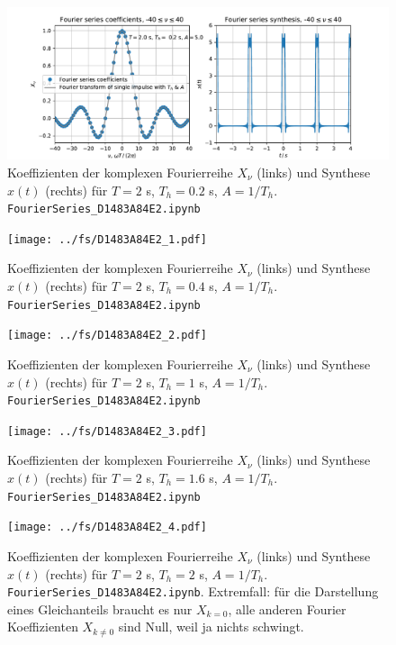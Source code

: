 \begin{figure}
\includegraphics[width=\textwidth]{../fs/D1483A84E2_0.pdf}
\caption{Koeffizienten der komplexen Fourierreihe $X_\nu$ (links) und Synthese $x(t)$ (rechts) für
$T=2$ s, $T_h=0.2$ s, $A=1/T_h$. \texttt{FourierSeries\_D1483A84E2.ipynb}}
\label{fig:D1483A84E2_0}
\end{figure}

\begin{figure}
\texttt{[image: ../fs/D1483A84E2\_1.pdf]}
\caption{Koeffizienten der komplexen Fourierreihe $X_\nu$ (links) und Synthese $x(t)$ (rechts) für
$T=2$ s, $T_h=0.4$ s, $A=1/T_h$. \texttt{FourierSeries\_D1483A84E2.ipynb}}
\label{fig:D1483A84E2_1}
\end{figure}

\begin{figure}
\texttt{[image: ../fs/D1483A84E2\_2.pdf]}
\caption{Koeffizienten der komplexen Fourierreihe $X_\nu$ (links) und Synthese $x(t)$ (rechts) für
$T=2$ s, $T_h=1$ s, $A=1/T_h$. \texttt{FourierSeries\_D1483A84E2.ipynb}}
\label{fig:D1483A84E2_2}
\end{figure}

\begin{figure}
\texttt{[image: ../fs/D1483A84E2\_3.pdf]}
\caption{Koeffizienten der komplexen Fourierreihe $X_\nu$ (links) und Synthese $x(t)$ (rechts) für
$T=2$ s, $T_h=1.6$ s, $A=1/T_h$. \texttt{FourierSeries\_D1483A84E2.ipynb}}
\label{fig:D1483A84E2_3}
\end{figure}

\begin{figure}
\texttt{[image: ../fs/D1483A84E2\_4.pdf]}
\caption{Koeffizienten der komplexen Fourierreihe $X_\nu$ (links) und Synthese $x(t)$ (rechts) für
$T=2$ s, $T_h=2$ s, $A=1/T_h$. \texttt{FourierSeries\_D1483A84E2.ipynb}. Extremfall: für die
Darstellung eines Gleichanteils braucht es nur $X_{k=0}$, alle anderen Fourier Koeffizienten
$X_{k \neq 0}$ sind Null, weil ja nichts schwingt.}
\label{fig:D1483A84E2_4}
\end{figure}




